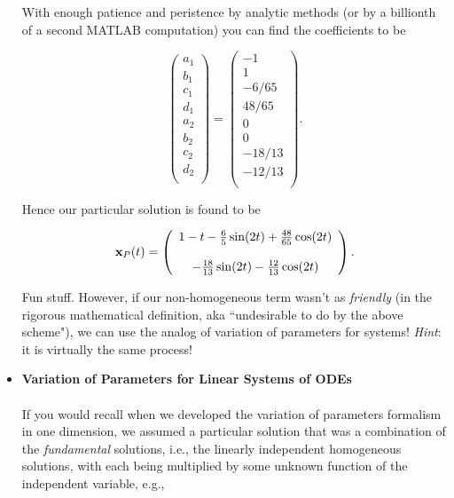 \begin{itemize}
With enough patience and peristence by analytic methods (or by a billionth of a second MATLAB computation) you can find the coefficients to be

$$\left( \begin{array}{c} a_1\\ b_1 \\ c_1 \\ d_1 \\ a_2 \\ b_2 \\ c_2 \\ d_2 \\ \end{array} \right) = \displaystyle\left( \begin{array}{c} -1\\1\\ -6/65 \\ 48/65 \\ 0 \\ 0 \\ -18/13 \\ -12/13 \\   \end{array}\right).$$

Hence our particular solution is found to be 

$${\bf{x}}_P(t) = \displaystyle\left( \begin{array}{c}  1-t-\frac{6}{5}\sin(2t)+\frac{48}{65}\cos(2t) \\  \\ -\frac{18}{13}\sin(2t) - \frac{12}{13} \cos(2t)          \end{array}\right).$$

Fun stuff. However, if our non-homogeneous term wasn't as \emph{friendly} (in the rigorous mathematical definition, aka ``undesirable to do by the above scheme"), we can use the analog of variation of parameters for systems! \emph{Hint}: it is virtually the same process!\\


%
%
\item {\bf{Variation of Parameters for Linear Systems of ODEs}} \\ \\

If you would recall when we developed the variation of parameters formalism in one dimension, we assumed a particular solution that was a combination of the \emph{fundamental} solutions, i.e., the linearly independent homogeneous solutions, with each being multiplied by some unknown function of the independent variable, e.g., 


\end{itemize}
